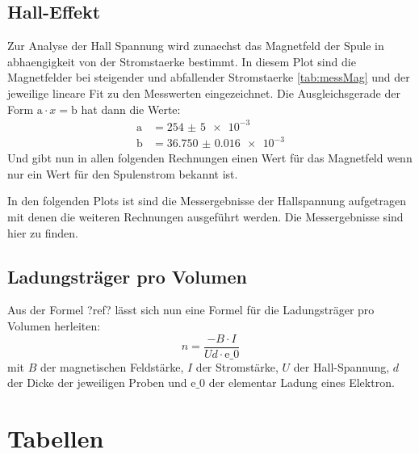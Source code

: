     \subsection{Hall-Effekt}
    Zur Analyse der Hall Spannung wird zunaechst das Magnetfeld der Spule in abhaengigkeit von der Stromstaerke bestimmt.
    In diesem Plot sind die Magnetfelder bei steigender und abfallender Stromstaerke \ref{tab:messMag} und der jeweilige lineare Fit zu den 
    Messwerten eingezeichnet.
    Die Ausgleichsgerade der Form $\text{a}\cdot x = \text{b}$ hat dann die Werte:
    \begin{align}
        \text{a} & = \num{254(5)e-3}\\
        \text{b} & = \num{36.750(16)e-3}
    \end{align}
    Und gibt nun in allen folgenden Rechnungen einen Wert für das Magnetfeld wenn nur ein Wert für den Spulenstrom bekannt ist.

    In den folgenden Plots ist sind die Messergebnisse der Hallspannung aufgetragen mit denen die weiteren Rechnungen ausgeführt werden.
    Die Messergebnisse sind hier zu finden.
    
    \subsection{Ladungsträger pro Volumen}

    Aus der Formel ?ref? lässt sich nun eine Formel für die Ladungsträger pro Volumen herleiten:
    \begin{equation}
        n = \frac{-B \cdot I}{Ud\cdot\text{e_0}}
    \end{equation}
    mit $B$ der magnetischen Feldstärke, $I$ der Stromstärke, $U$ der Hall-Spannung, $d$ der Dicke der jeweiligen Proben und $\text{e_0}$ der 
    elementar Ladung eines Elektron.
    \section{Tabellen}

